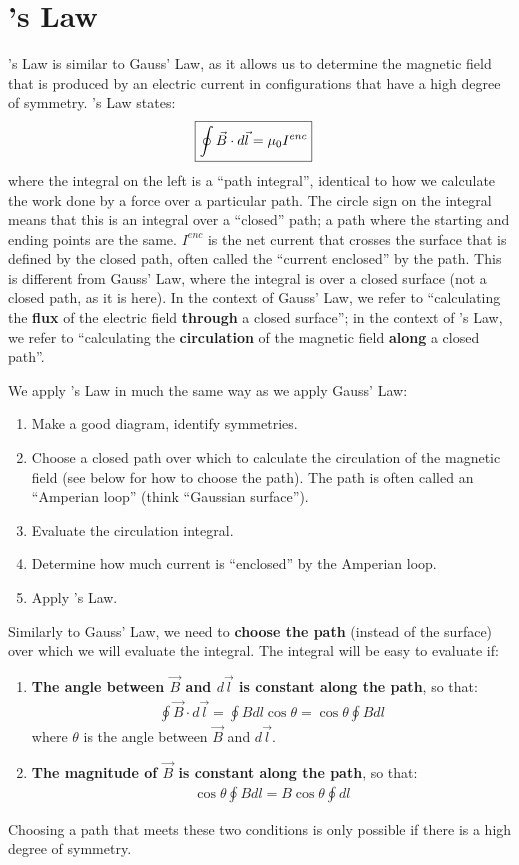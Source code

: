 \section{\ampere's Law}
\ampere's Law is similar to Gauss' Law, as it allows us to determine the magnetic field that is produced by an electric current in configurations that have a high degree of symmetry. \ampere's Law states:
\begin{align*}
\Aboxed{\oint \vec B \cdot d\vec l =\mu_0 I^{enc}}
\end{align*}
where the integral on the left is a ``path integral'', identical to how we calculate the work done by a force over a particular path. The circle sign on the integral means that this is an integral over a ``closed'' path; a path where the starting and ending points are the same. $I^{enc}$ is the net current that crosses the surface that is defined by the closed path, often called the ``current enclosed'' by the path. This is different from Gauss' Law, where the integral is over a closed surface (not a closed path, as it is here). In the context of Gauss' Law, we refer to ``calculating the \textbf{flux} of the electric field \textbf{through} a closed surface''; in the context of \ampere's Law, we refer to ``calculating the \textbf{circulation} of the magnetic field \textbf{along} a closed path''.

We apply \ampere's Law in much the same way as we apply Gauss' Law:
\begin{enumerate}
\item Make a good diagram, identify symmetries.
\item Choose a closed path over which to calculate the circulation of the magnetic field (see below for how to choose the path). The path is often called an ``Amperian loop'' (think ``Gaussian surface'').
\item Evaluate the circulation integral. 
\item Determine how much current is ``enclosed'' by the Amperian loop. 
\item Apply \ampere's Law.
\end{enumerate}

Similarly to Gauss' Law, we need to \textbf{choose the path} (instead of the surface) over which we will evaluate the integral. The integral will be easy to evaluate if:
\begin{enumerate}
\item \textbf{The angle between $\vec B$ and $d\vec l$ is constant along the path}, so that:
\begin{align*}
\oint  \vec B \cdot d\vec l = \oint B dl \cos\theta = \cos\theta \oint B dl
\end{align*}
where $\theta$ is the angle between $\vec B$ and $d\vec l$.
\item \textbf{The magnitude of $\vec B$ is constant along the path}, so that:
\begin{align*}
\cos\theta \oint B dl = B\cos\theta \oint dl
\end{align*}
\end{enumerate}
Choosing a path that meets these two conditions is only possible if there is a high degree of symmetry.

